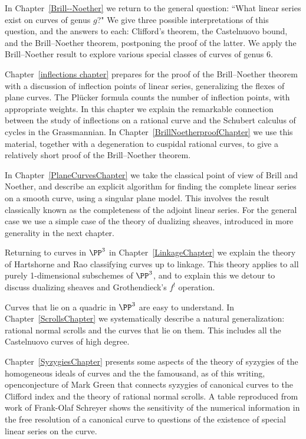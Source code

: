 In Chapter~\ref{Brill--Noether} we return to the general question:
``What linear series exist on curves of genus $g$?" We give three
possible interpretations of this question, and the answers to each:
Clifford's theorem, the Castelnuovo bound, and the Brill--Noether
theorem, postponing the proof of the latter.
We apply the Brill--Noether result to explore  various special classes of curves of genus 6.

Chapter~\ref{inflections chapter} prepares for the proof of the Brill--Noether theorem 
with a discussion of inflection points of linear series, generalizing the flexes of plane curves. The Pl\"ucker formula
counts the number of inflection points, with appropriate weights. In this chapter we explain
the remarkable connection between the study of inflections on a rational curve and the Schubert calculus of cycles in the Grassmannian. In Chapter~\ref{BrillNoetherproofChapter} we use this material, together with a degeneration to cuspidal rational curves, to give a relatively short proof of the Brill--Noether theorem.

In Chapter~\ref{PlaneCurvesChapter} we take the classical point of view of Brill and Noether,
and describe an explicit algorithm for finding the complete linear series on a smooth curve, using a singular plane model. This involves the result classically known as the completeness of the adjoint linear series. For the general case we use a simple case of the theory of dualizing sheaves, introduced in more generality in the next chapter.

Returning to curves in $\PP^{3}$ in Chapter~\ref{LinkageChapter} we explain the theory of Hartshorne and Rao classifying curves up to linkage. This theory applies to all purely 1-dimensional subschemes of $\PP^{3}$, and to explain this
we detour to discuss dualizing sheaves and Grothendieck's $f^{!}$ operation.

Curves that lie on a quadric in $\PP^3$ are easy to understand. In Chapter~\ref{ScrollsChapter} we systematically describe a natural generalization: rational normal scrolls and the curves that lie on them. This includes all the Castelnuovo curves of high degree. 

Chapter~\ref{SyzygiesChapter} presents some aspects of the theory of syzygies of the homogeneous ideals of curves and the the famous\emdash and, as of this writing, open\emdash conjecture of Mark Green that connects syzygies of canonical curves to the Clifford index and the theory of rational normal scrolls. A table reproduced from work of Frank-Olaf Schreyer shows the sensitivity of the numerical information in the free resolution of a canonical curve to questions of the existence of special linear series on the curve.

